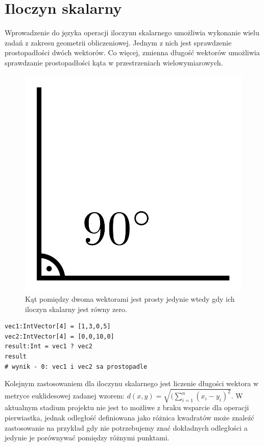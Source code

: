 \section{Iloczyn skalarny}
Wprowadzenie do języka operacji iloczynu skalarnego umożliwia wykonanie wielu zadań z zakresu geometrii obliczeniowej. Jednym z nich jest sprawdzenie prostopadłości dwóch wektorów. Co więcej, zmienna długość wektorów umożliwia sprawdzanie prostopadłości kąta w przestrzeniach wielowymiarowych.
\begin{figure}[!ht]
\centerline{
\includegraphics[scale=0.1]{images/kat_prosty}}
\caption{Kąt pomiędzy dwoma wektorami jest prosty jedynie wtedy gdy ich iloczyn skalarny jest równy zero.}
\end{figure}
\begin{lstlisting}[frame=single]
vec1:IntVector[4] = [1,3,0,5]
vec2:IntVector[4] = [0,0,10,0]
result:Int = vec1 ? vec2
result 
# wynik - 0: vec1 i vec2 sa prostopadle
\end{lstlisting}
Kolejnym zastosowaniem dla iloczynu skalarnego jest liczenie długości wektora w metryce euklidesowej zadanej wzorem:
$ d(x,y) = \sqrt{(\sum_{i=1}^{n} (x_i - y_i)^2}$. W aktualnym stadium projektu nie jest to możliwe z braku wsparcie dla operacji pierwiastka, jednak odległość definiowana jako różnica kwadratów może znaleźć zastosowanie na przykład gdy nie potrzebujemy znać dokładnych odległości a jedynie je porównywać pomiędzy różnymi punktami.

